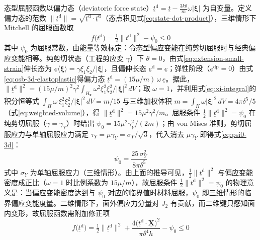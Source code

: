 态型屈服函数以偏力态（deviatoric force state）$\underline{t}^{\mathrm{d}}=\underline{t}-\tfrac{3k\theta}{m}\omega|\boldsymbol{\xi}|$ 为自变量。定义偏力态的范数 $\|\underline{t}^{\mathrm{d}}\|=\sqrt{\underline{t}^{\mathrm{d}}\cdot\underline{t}^{\mathrm{d}}}$（态点积见式\eqref{eq:state-dot-product}），三维情形下 Mitchell 的屈服函数取 \cite{Mitchell2011}
\begin{equation}
  f\bigl(\underline{t}^{\mathrm{d}}\bigr)=\tfrac{1}{2}\bigl\|\underline{t}^{\mathrm{d}}\bigr\|^{2}-\psi_{0}\le 0
  \label{eq:yield-mitchell}
\end{equation}
其中 $\psi_{0}$ 为屈服常数，由能量等效标定：令态型偏应变能在纯剪切屈服时与经典偏应变能相等。纯剪切状态（工程剪应变 $\gamma$）下 $\theta=0$，由式\eqref{eq:extension-small-strain}伸长态为 $\underline{e}\langle\boldsymbol{\xi}\rangle=\gamma\xi_{1}\xi_{2}/|\boldsymbol{\xi}|$，且偏伸长态 $\underline{e}^{\mathrm{d}}=\underline{e}$；弹性阶段（$\underline{e}^{\mathrm{dp}}=0$）由式\eqref{eq:osb-3d-elastoplastic}得偏力态 $\underline{t}^{\mathrm{d}}=(15\mu/m)\,\omega\,\underline{e}$。据此，$\|\underline{t}^{\mathrm{d}}\|^{2}=(15\mu/m)^{2}\gamma^{2}\int_{H_{\mathbf{x}}}\omega^{2}\xi_{1}^{2}\xi_{2}^{2}/|\boldsymbol{\xi}|^{2}\,dV$；取 $\omega=1$，并利用式\eqref{eq:xi-integral}的积分恒等式 $\int_{H}\omega\,\xi_{1}^{2}\xi_{2}^{2}/|\boldsymbol{\xi}|^{2}\,dV=m/15$ 与三维加权体积 $m=\int_{H}\omega|\boldsymbol{\xi}|^{2}\,dV=4\pi\delta^{5}/5$（式\eqref{eq:weighted-volume}），得 $\|\underline{t}^{\mathrm{d}}\|^{2}=15\mu^{2}\gamma^{2}/m$。屈服条件 $\tfrac{1}{2}\|\underline{t}^{\mathrm{d}}\|^{2}=\psi_{0}$ 在纯剪切屈服（$\gamma=\gamma_{Y}$）时给出 $\psi_{0}=15\mu^{2}\gamma_{Y}^{2}/(2m)$；由 von Mises 准则，剪切屈服应力与单轴屈服应力满足 $\tau_{Y}=\mu\gamma_{Y}=\sigma_{Y}/\sqrt{3}$，代入消去 $\mu\gamma_{Y}$ 即得式\eqref{eq:psi0-3d}：
\begin{equation}
  \psi_{0}=\frac{25\,\sigma_{Y}^{2}}{8\pi\delta^{5}}
  \label{eq:psi0-3d}
\end{equation}
式中 $\sigma_{Y}$ 为单轴屈服应力（三维情形）\cite{Mitchell2011}。由上面的推导可见，$\tfrac{1}{2}\|\underline{t}^{\mathrm{d}}\|^{2}$ 与偏应变能密度成正比（$\omega=1$ 时比例系数为 $15\mu/m$），故屈服条件 $\tfrac{1}{2}\|\underline{t}^{\mathrm{d}}\|^{2}=\psi_{0}$ 的物理意义是：当偏应变能密度达到与 $\psi_{0}$ 对应的临界值时材料屈服，$\psi_{0}$ 即三维情形的临界偏应变能度量。二维情形下，面外偏应力分量对 $J_{2}$ 有贡献，而二维键只感知面内变形，故屈服函数需附加修正项 \cite{Mousavi2021}
\begin{equation}
  f\bigl(\underline{t}^{\mathrm{d}}\bigr)=
  \tfrac{1}{2}\bigl\|\underline{t}^{\mathrm{d}}\bigr\|^{2}+
  \frac{4\bigl(\underline{t}^{\mathrm{d}}\cdot\underline{\mathbf{X}}\bigr)^{2}}{\pi\delta^{4}h}-\psi_{0}\le 0
  \label{eq:yield-mousavi}
\end{equation}
